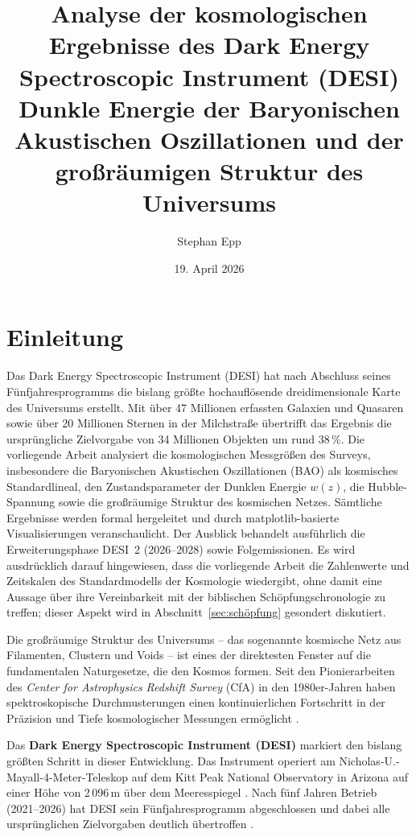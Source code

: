 ﻿\documentclass[a4paper,12pt]{article}
\title{\textbf{Analyse der kosmologischen Ergebnisse des Dark Energy Spectroscopic Instrument (DESI)}\\
  {\Large Dunkle Energie der Baryonischen Akustischen Oszillationen und der großräumigen Struktur des Universums}}
\date{19. April 2026}
\author{Stephan Epp}
\theoremstyle{definition}
\theoremstyle{remark}
\begin{document}

\maketitle

\tableofcontents
\newpage

\section{Einleitung}
\label{sec:einleitung}
Das Dark Energy Spectroscopic Instrument (DESI) hat nach Abschluss seines
Fünfjahresprogramms die bislang größte hochauflösende dreidimensionale Karte
des Universums erstellt. Mit über 47 Millionen erfassten Galaxien und Quasaren
sowie über 20 Millionen Sternen in der Milchstraße übertrifft das Ergebnis die
ursprüngliche Zielvorgabe von 34 Millionen Objekten um rund 38\,\%. Die
vorliegende Arbeit analysiert die kosmologischen Messgrößen des Surveys,
insbesondere die Baryonischen Akustischen Oszillationen (BAO) als kosmisches
Standardlineal, den Zustandsparameter der Dunklen Energie $w(z)$, die
Hubble-Spannung sowie die großräumige Struktur des kosmischen Netzes.
Sämtliche Ergebnisse werden formal hergeleitet und durch matplotlib-basierte
Visualisierungen veranschaulicht. Der Ausblick behandelt ausführlich die
Erweiterungsphase DESI~2 (2026--2028) sowie Folgemissionen. Es wird
ausdrücklich darauf hingewiesen, dass die vorliegende Arbeit die
Zahlenwerte und Zeitskalen des Standardmodells der Kosmologie wiedergibt,
ohne damit eine Aussage über ihre Vereinbarkeit mit der biblischen
Schöpfungschronologie zu treffen; dieser Aspekt wird in Abschnitt~\ref{sec:schöpfung}
gesondert diskutiert.

Die großräumige Struktur des Universums -- das sogenannte kosmische Netz aus
Filamenten, Clustern und Voids -- ist eines der direktesten Fenster auf die
fundamentalen Naturgesetze, die den Kosmos formen. Seit den Pionierarbeiten
des \textit{Center for Astrophysics Redshift Survey} (CfA) in den 1980er-Jahren
haben spektroskopische Durchmusterungen einen kontinuierlichen Fortschritt in
der Präzision und Tiefe kosmologischer Messungen ermöglicht \cite{geller1989}.

Das \textbf{Dark Energy Spectroscopic Instrument (DESI)} markiert den bislang
größten Schritt in dieser Entwicklung. Das Instrument operiert am
Nicholas-U.-Mayall-4-Meter-Teleskop auf dem Kitt Peak National Observatory
in Arizona auf einer Höhe von 2\,096\,m über dem Meeresspiegel \cite{desi2016}.
Nach fünf Jahren Betrieb (2021--2026) hat DESI sein Fünfjahresprogramm
abgeschlossen und dabei alle ursprünglichen Zielvorgaben deutlich übertroffen
\cite{desi2024dr1}.
\end{document}
